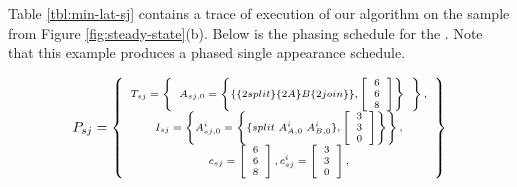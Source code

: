 Table \ref{tbl:min-lat-sj} contains a trace of execution of our
algorithm on the sample {\splitjoin} from Figure
\ref{fig:steady-state}(b). Below is the phasing schedule for the
{\splitjoin}. Note that this example produces a phased single
appearance schedule.

\begin{displaymath} \scriptsize
P_{sj} = \left\{
\begin{array}{c}
T_{sj} = \left\{
\begin{array}{c}
A_{sj,0} = \left\{ \{\{2 split\}\{2A\}B\{2 join\}\}, \left[\begin{array}{c} 6 \\ 6 \\ 8 \end{array}\right]\right\} \\
\end{array}\right\}, \\
I_{sj} = \left\{ A^i_{sj,0} = \left\{
\{split\ A^i_{A,0}\ A^i_{B,0}\}, \left[\begin{array}{c} 3 \\ 3 \\ 0 \\
\end{array}\right]\right\}
\right\}, \\
c_{sj} = \left[ \begin{array}{c} 6 \\ 6 \\ 8 \end{array} \right],
c^i_{sj} = \left[ \begin{array}{c} 3 \\ 3 \\ 0 \end{array}
\right],
\end{array}
\right\}
\end{displaymath}
